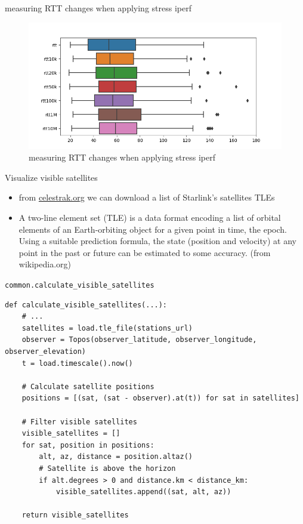 \documentclass[NET,english,beameralt]{tumbeamer}
\begin{document}
\begin{frame}{measuring RTT changes when applying stress iperf}
\begin{figure}
    \includegraphics[width=1\textwidth]{pics/rtt-iperf-stress.png}
    \caption[short]{measuring RTT changes when applying stress iperf}
\end{figure}
\end{frame}

\begin{frame}{Visualize visible satellites}
\begin{itemize}
    \item from \href{celestrak.org}{celestrak.org} we can download a list of Starlink's satellites TLEs
    \item A two-line element set (TLE) is a data format encoding a list of orbital elements of an Earth-orbiting object for a given point in time, the epoch. Using a suitable prediction formula, the state (position and velocity) at any point in the past or future can be estimated to some accuracy. (from wikipedia.org)
\end{itemize}
\end{frame}

\begin{frame}[fragile]{\texttt{common.calculate\_visible\_satellites}}
\begin{verbatim}
def calculate_visible_satellites(...):
    # ...
    satellites = load.tle_file(stations_url)
    observer = Topos(observer_latitude, observer_longitude, observer_elevation)
    t = load.timescale().now()

    # Calculate satellite positions
    positions = [(sat, (sat - observer).at(t)) for sat in satellites]
    
    # Filter visible satellites
    visible_satellites = []
    for sat, position in positions:
        alt, az, distance = position.altaz()
        # Satellite is above the horizon
        if alt.degrees > 0 and distance.km < distance_km:
            visible_satellites.append((sat, alt, az))

    return visible_satellites
\end{verbatim}
\end{frame}
\end{document}
